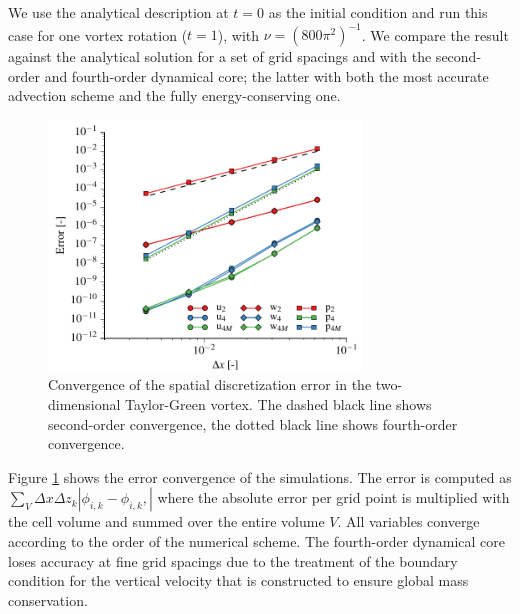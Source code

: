 \documentclass[gmd]{copernicus}
\begin{document}
We use the analytical description at $t=0$ as the initial condition and run this case for one vortex rotation ($t = 1$), with $\nu = (800 \pi^2)^{-1}$. We compare the result against the analytical solution for a set of grid spacings and with the second-order and fourth-order dynamical core; the latter with both the most accurate advection scheme and the fully energy-conserving one.
\begin{figure}[t]
	\vspace*{2mm}
	\begin{center}
		\includegraphics[width=8.3cm]{figs/taylorgreen.pdf}
	\end{center}
	\caption{Convergence of the spatial discretization error in the two-dimensional Taylor-Green vortex. The dashed black line shows second-order convergence, the dotted black line shows fourth-order convergence.}\label{fig:taylorgreen}
\end{figure}

Figure \ref{fig:taylorgreen} shows the error convergence of the simulations. The error is computed as $\sum_V \Delta x \Delta z_k \left| \phi_{i,k} - \phi_{i,k}, \right|$ where the absolute error per grid point is multiplied with the cell volume and summed over the entire volume $V$. All variables converge according to the order of the numerical scheme. The fourth-order dynamical core loses accuracy at fine grid spacings due to the treatment of the boundary condition for the vertical velocity that is constructed to ensure global mass conservation.
\end{document}
